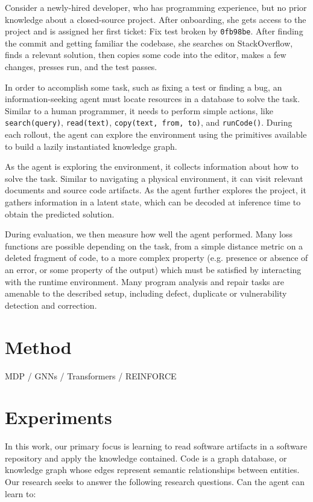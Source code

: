 \documentclass[11pt]{article}
\begin{document}
Consider a newly-hired developer, who has programming experience, but no prior knowledge about a closed-source project. After onboarding, she gets access to the project and is assigned her first ticket: Fix test broken by \texttt{0fb98be}. After finding the commit and getting familiar the codebase, she searches on StackOverflow, finds a relevant solution, then copies some code into the editor, makes a few changes, presses run, and the test passes.

In order to accomplish some task, such as fixing a test or finding a bug, an information-seeking agent must locate resources in a database to solve the task. Similar to a human programmer, it needs to perform simple actions, like \texttt{search(query)}, \texttt{read(text)}, \texttt{copy(text, from, to)}, and \texttt{runCode()}. During each rollout, the agent can explore the environment using the primitives available to build a lazily instantiated knowledge graph.

As the agent is exploring the environment, it collects information about how to solve the task. Similar to navigating a physical environment, it can visit relevant documents and source code artifacts. As the agent further explores the project, it gathers information in a latent state, which can be decoded at inference time to obtain the predicted solution.

During evaluation, we then measure how well the agent performed. Many loss functions are possible depending on the task, from a simple distance metric on a deleted fragment of code, to a more complex property (e.g. presence or absence of an error, or some property of the output) which must be satisfied by interacting with the runtime environment. Many program analysis and repair tasks are amenable to the described setup, including defect, duplicate or vulnerability detection and correction.

\section{Method}

MDP / GNNs / Transformers / REINFORCE

\section{Experiments}

In this work, our primary focus is learning to read software artifacts in a software repository and apply the knowledge contained. Code is a graph database, or knowledge graph whose edges represent semantic relationships between entities. Our research seeks to answer the following research questions. Can the agent can learn to:
\end{document}
